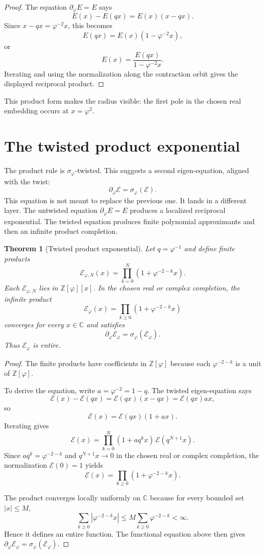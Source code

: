 \documentclass[11pt]{article}
\newtheorem{theorem}[definition]{Theorem}
\newcommand{\sig}{\sigma}
\newcommand{\ph}{\varphi}
\newcommand{\Z}{\mathbb{Z}}
\newcommand{\C}{\mathbb{C}}
\newcommand{\dd}{\partial_{\ph}}
\newcommand{\Etw}{\mathcal E_{\ph}}
\begin{document}
\begin{proof}
The equation $\dd E=E$ says
\[
    E(x)-E(qx)=E(x)(x-qx).
\]
Since $x-qx=\ph^{-2}x$, this becomes
\[
    E(qx)=E(x)(1-\ph^{-2}x),
\]
or
\[
    E(x)=\frac{E(qx)}{1-\ph^{-2}x}.
\]
Iterating and using the normalization along the contraction orbit gives the displayed reciprocal product.
\end{proof}

This product form makes the radius visible: the first pole in the chosen real embedding occurs at $x=\ph^2$.

\section{The twisted product exponential}

The product rule is $\sig_{\ph}$-twisted.  This suggests a second eigen-equation, aligned with the twist:
\[
    \dd\mathcal E=\sig_{\ph}(\mathcal E).
\]
This equation is not meant to replace the previous one.  It lands in a different layer.  The untwisted equation $\dd E=E$ produces a localized reciprocal exponential.  The twisted equation produces finite polynomial approximants and then an infinite product completion.

\begin{theorem}[Twisted product exponential]
Let $q=\ph^{-1}$ and define finite products
\[
    \mathcal E_{\ph,N}(x)=\prod_{k=0}^{N}(1+\ph^{-2-k}x).
\]
Each $\mathcal E_{\ph,N}$ lies in $\Z[\ph][x]$.  In the chosen real or complex completion, the infinite product
\[
    \Etw(x)=\prod_{k\ge0}(1+\ph^{-2-k}x)
\]
converges for every $x\in\C$ and satisfies
\[
    \dd\Etw=\sig_{\ph}(\Etw).
\]
Thus $\Etw$ is entire.
\end{theorem}

\begin{proof}
The finite products have coefficients in $\Z[\ph]$ because each $\ph^{-2-k}$ is a unit of $\Z[\ph]$.

To derive the equation, write $a=\ph^{-2}=1-q$.  The twisted eigen-equation says
\[
    \mathcal E(x)-\mathcal E(qx)=\mathcal E(qx)(x-qx)=\mathcal E(qx)ax,
\]
so
\[
    \mathcal E(x)=\mathcal E(qx)(1+ax).
\]
Iterating gives
\[
    \mathcal E(x)=\prod_{k=0}^{N}(1+aq^kx)\,\mathcal E(q^{N+1}x).
\]
Since $aq^k=\ph^{-2-k}$ and $q^{N+1}x\to0$ in the chosen real or complex completion, the normalization $\mathcal E(0)=1$ yields
\[
    \mathcal E(x)=\prod_{k\ge0}(1+\ph^{-2-k}x).
\]

The product converges locally uniformly on $\C$ because for every bounded set $|x|\le M$,
\[
    \sum_{k\ge0}|\ph^{-2-k}x|
    \le M\sum_{k\ge0}\ph^{-2-k}<\infty.
\]
Hence it defines an entire function.  The functional equation above then gives $\dd\Etw=\sig_{\ph}(\Etw)$.
\end{proof}
\end{document}
